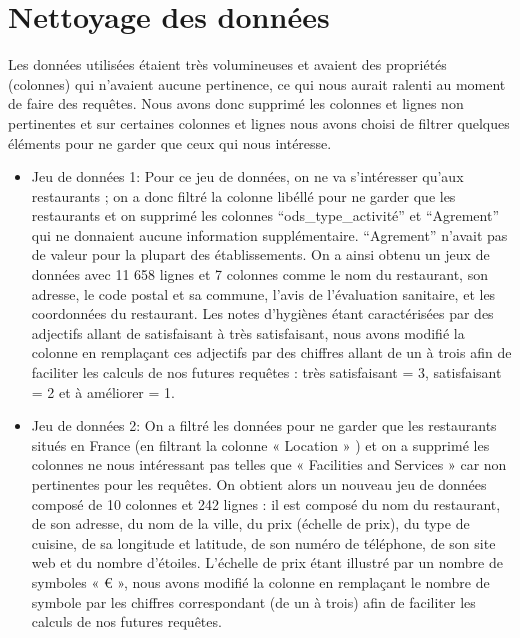 \documentclass[mstat,12pt]{unswthesis}
\begin{document}
\hypertarget{nettoyage-des-donnuxe9es}{%
\section{Nettoyage des données}\label{nettoyage-des-donnuxe9es}}

Les données utilisées étaient très volumineuses et avaient des
propriétés (colonnes) qui n'avaient aucune pertinence, ce qui nous
aurait ralenti au moment de faire des requêtes. Nous avons donc supprimé
les colonnes et lignes non pertinentes et sur certaines colonnes et
lignes nous avons choisi de filtrer quelques éléments pour ne garder que
ceux qui nous intéresse.

\begin{itemize}
\item
  Jeu de données 1: Pour ce jeu de données, on ne va s'intéresser qu'aux
  restaurants ; on a donc filtré la colonne libéllé pour ne garder que
  les restaurants et on supprimé les colonnes ``ods\_type\_activité'' et
  ``Agrement'' qui ne donnaient aucune information supplémentaire.
  ``Agrement'' n'avait pas de valeur pour la plupart des établissements.
  On a ainsi obtenu un jeux de données avec 11 658 lignes et 7 colonnes
  comme le nom du restaurant, son adresse, le code postal et sa commune,
  l'avis de l'évaluation sanitaire, et les coordonnées du restaurant.
  Les notes d'hygiènes étant caractérisées par des adjectifs allant de
  satisfaisant à très satisfaisant, nous avons modifié la colonne en
  remplaçant ces adjectifs par des chiffres allant de un à trois afin de
  faciliter les calculs de nos futures requêtes : très satisfaisant = 3,
  satisfaisant = 2 et à améliorer = 1.
\item
  Jeu de données 2: On a filtré les données pour ne garder que les
  restaurants situés en France (en filtrant la colonne « Location » ) et
  on a supprimé les colonnes ne nous intéressant pas telles que «
  Facilities and Services » car non pertinentes pour les requêtes. On
  obtient alors un nouveau jeu de données composé de 10 colonnes et 242
  lignes : il est composé du nom du restaurant, de son adresse, du nom
  de la ville, du prix (échelle de prix), du type de cuisine, de sa
  longitude et latitude, de son numéro de téléphone, de son site web et
  du nombre d'étoiles. L'échelle de prix étant illustré par un nombre de
  symboles « € », nous avons modifié la colonne en remplaçant le nombre
  de symbole par les chiffres correspondant (de un à trois) afin de
  faciliter les calculs de nos futures requêtes.
\end{itemize}
\end{document}
